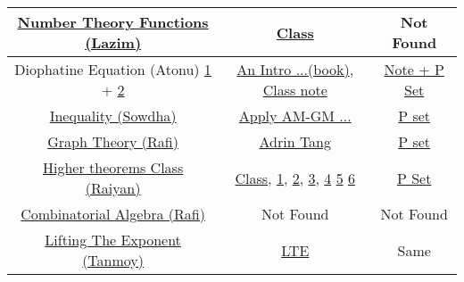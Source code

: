 \documentclass{article}
\begin{document}
\begin{center}
\begin{tabular}{|c|c|c|}
			\href{https://www.youtube.com/watch?v=BIocWacBJEs}{Number Theory Functions (Lazim)} & \href{https://drive.google.com/file/d/1pedr_KX0Yom8O2hremeRoJO13zhEeEmY/view}{Class} & Not Found \\
			\hline 
			Diophatine Equation (Atonu) \href{https://www.youtube.com/watch?v=YeurXbh2sIQ}{1} + \href{https://www.youtube.com/watch?v=3ZBGv6dH37o}{2} & \href{https://drive.google.com/file/d/1lHBgt42uKI6qc0-Yt_Sx7boahxsYLVN7/view}{An Intro ...(book)}, \href{https://drive.google.com/file/d/12nate-JVlXwJUkMS7ja6ftBvyTWatace/view?usp=sharing}{Class note} & \href{https://drive.google.com/file/d/16tC_XxRU31j_iOVZ3gEb_BMcZlQBfIP7/view?usp=sharing}{Note + P Set} \\
			\hline 
			\href{https://www.youtube.com/watch?v=H7UwnAGZY0A}{Inequality (Sowdha)} & \href{https://drive.google.com/file/d/1Vm117lBF5yuZrRGMjmMS-HccPmknl5uK/view?usp=sharing}{Apply AM-GM ...} & \href{https://drive.google.com/file/d/12GWPOw5_9c4-KD5PNCdJSS0i3lAORI5s/view}{P set} \\
			\hline
			\href{https://www.youtube.com/watch?v=ZXr4S48WIfY}{Graph Theory (Rafi)} & \href{https://drive.google.com/file/d/1Bx9a3svwtSh4V26o5hiTaBI9GTUsJnZg/view?usp=sharing}{Adrin Tang} & \href{https://drive.google.com/file/d/1YRNcY2ybUOOc8vldQBhBhDzPqZ_h6Mvz/view?usp=sharing}{P set} \\
			\hline 
			\href{https://www.youtube.com/watch?v=M5XK1DRmvQ4}{Higher theorems Class (Raiyan)} & \href{https://drive.google.com/file/d/1re420K24_RUHWqmKCKolIOnNfHE_DdBx/view}{Class}, \href{https://drive.google.com/file/d/1R0FYTojb1A0fsxsK4U5EbSqYgPjFNQjA/view}{1}, \href{https://drive.google.com/file/d/1jwEP2kMAX0CfU84L9MqnyQi-RkuCPndY/view}{2}, 
			\href{https://drive.google.com/file/d/1Xvko-uY1TfXguyLsI0SJyINVoQ6mLHOB/view}{3},
			\href{https://drive.google.com/file/d/1fm_irN-VGuGjgA4K2xioDTOWrRXyhwHh/view}{4}
			\href{https://drive.google.com/file/d/1j3XsSZXVlacnieq_bEXGKfBtYgxTPMks/view}{5} 
			\href{https://drive.google.com/file/d/11iIS0QZj-Ge798GngpVY1SDxKPipRfIA/view}{6} & \href{https://drive.google.com/file/d/1JdYioYeJhqugbqTJBKTQL6XvSNxZh1bw/view}{P Set} \\
			\hline 
			\href{https://www.youtube.com/watch?v=jFvk-na3WC0}{Combinatorial Algebra (Rafi)} & Not Found & Not Found \\
			\hline 
			\href{https://www.youtube.com/watch?v=D7Pt_mROJcw}{Lifting The Exponent (Tanmoy)} & \href{https://drive.google.com/file/d/1en-kqZcoNRirudjEO_iTA67T6MgCBGPi/view}{LTE} & Same \\

\end{tabular}
\end{center}
\end{document}
